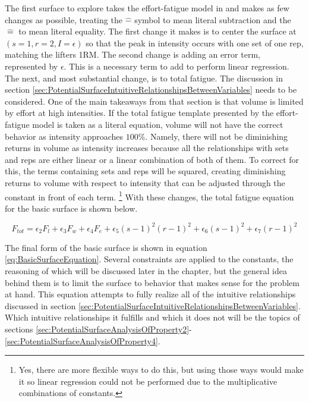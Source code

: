 The first surface to explore takes the effort-fatigue model in and makes as few changes as possible, treating the $\hat{-}$ symbol to mean literal subtraction and the $\hat{=}$ to mean literal equality. The first change it makes is to center the surface at $(s=1,r=2,I=\epsilon)$ so that the peak in intensity occurs with one set of one rep, matching the lifters 1RM. The second change is adding an error term, represented by $\epsilon$. This is a necessary term to add to perform linear regression. The next, and most substantial change, is to total fatigue. The discussion in section \ref{sec:PotentialSurfaceIntuitiveRelationshipsBetweenVariables} needs to be considered. One of the main takeaways from that section is that volume is limited by effort at high intensities. If the total fatigue template presented by the effort-fatigue model is taken as a literal equation, volume will not have the correct behavior as intensity approaches $100$\%. Namely, there will not be diminishing returns in volume as intensity increases because all the relationships with sets and reps are either linear or a linear combination of both of them. To correct for this, the terms containing sets and reps will be squared, creating diminishing returns to volume with respect to intensity that can be adjusted through the constant in front of each term. \footnote{Yes, there are more flexible ways to do this, but using those ways would make it so linear regression could not be performed due to the multiplicative combinations of constants.} With these changes, the total fatigue equation for the basic surface is shown below. 

\begin{equation*}
	F_{tot} = \epsilon_2 F_l+\epsilon_3 F_w+\epsilon_4 F_e+\epsilon_5 (s-1)^2(r-1)^2+\epsilon_6 (s-1)^2+\epsilon_7 (r-1)^2
\end{equation*}

The final form of the basic surface is shown in equation \ref{eq:BasicSurfaceEquation}. Several constraints are applied to the constants, the reasoning of which will be discussed later in the chapter, but the general idea behind them is to limit the surface to behavior that makes sense for the problem at hand. This equation attempts to fully realize all of the intuitive relationships discussed in section \ref{sec:PotentialSurfaceIntuitiveRelationshipsBetweenVariables}. Which intuitive relationships it fulfills and which it does not will be the topics of sections \ref{sec:PotentialSurfaceAnalysisOfProperty2}-\ref{sec:PotentialSurfaceAnalysisOfProperty4}.

